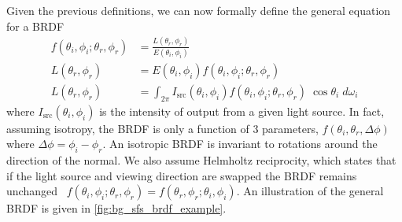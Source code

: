 Given the previous definitions, we can now formally define the general equation
for a BRDF
\begin{align}\label{eg:bg_sfs_general_brdf}
	f(\theta_i,\phi_i;\theta_r,\phi_r) &= \frac{L(\theta_r,\phi_r)}{E(\theta_i,\phi_i)} \\
	L(\theta_r,\phi_r)                 &= E(\theta_i,\phi_i) f(\theta_i,\phi_i;\theta_r,\phi_r) \\
	L(\theta_r,\phi_r)                 &= \int_{2\pi} I_{\operatorname{src}}(\theta_i,\phi_i) f(\theta_i,\phi_i;\theta_r,\phi_r) \; \cos{\theta_i} \; d\omega_i
\end{align}
where $I_{\operatorname{src}}(\theta_i,\phi_i)$ is the intensity of output
from a given light source. In fact, assuming isotropy, the BRDF is
only a function of 3 parameters, $f(\theta_i,\theta_r, \Delta \phi)$ where
$\Delta \phi = \phi_i - \phi_r$. An isotropic BRDF is invariant to rotations
around the direction of the normal. We also assume Helmholtz reciprocity, which
states that if the light source and viewing direction are swapped the BRDF
remains unchanged
\ie~$f(\theta_i,\phi_i;\theta_r,\phi_r) = f(\theta_r,\phi_r;\theta_i,\phi_i)$.
An illustration of the general BRDF is given in \cref{fig:bg_sfs_brdf_example}.
